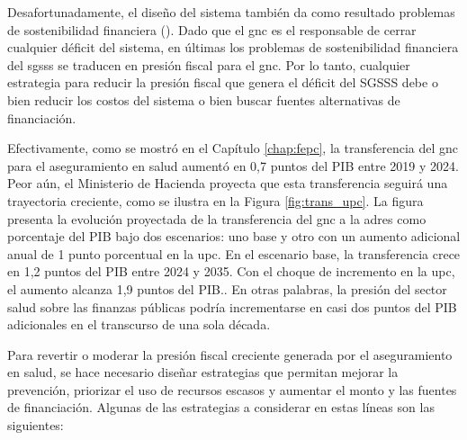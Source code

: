 Desafortunadamente, el diseño del sistema también da como resultado problemas de sostenibilidad financiera (\cite{Fedesarrollo2012}). Dado que el \gls{gnc} es el responsable de cerrar cualquier déficit del sistema, en últimas los problemas de sostenibilidad financiera del \gls{sgsss} se traducen en presión fiscal para el \gls{gnc}. Por lo tanto, cualquier estrategia para reducir la presión fiscal que genera el déficit del SGSSS debe o bien reducir los costos del sistema o bien buscar fuentes alternativas de financiación. 




Efectivamente, como se mostró en el Capítulo \ref{chap:fepc}, la transferencia del \gls{gnc} para el aseguramiento en salud aumentó en 0,7 puntos del PIB entre 2019 y 2024. Peor aún, el Ministerio de Hacienda proyecta que esta transferencia seguirá una trayectoria creciente, como se ilustra en la Figura \ref{fig:trans_upc}. La figura presenta la evolución proyectada de la transferencia del \gls{gnc} a la \gls{adres} como porcentaje del PIB bajo dos escenarios: uno base y otro con un aumento adicional anual de 1 punto porcentual en la \gls{upc}. En el escenario base, la transferencia crece en 1,2 puntos del PIB entre 2024 y 2035. Con el choque de incremento en la \gls{upc}, el aumento alcanza 1,9 puntos del PIB.. En otras palabras, la presión del sector salud sobre las finanzas públicas podría incrementarse en casi dos puntos del PIB adicionales en el transcurso de una sola década.


Para revertir o moderar la presión fiscal creciente generada por el aseguramiento en salud, se hace necesario diseñar estrategias que permitan mejorar la prevención, priorizar el uso de recursos escasos y aumentar el monto y las fuentes de financiación. Algunas de las estrategias a considerar en estas líneas son las siguientes:

